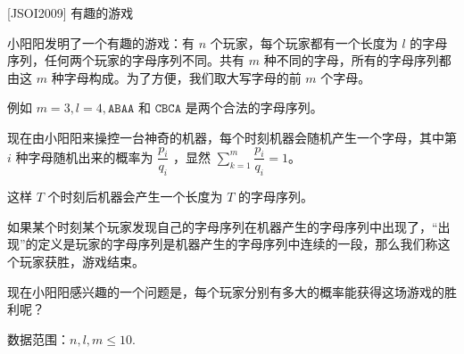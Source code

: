 \documentclass{beamer}
\begin{document}
\begin{frame}{[JSOI2009] 有趣的游戏}
    \footnotesize

    小阳阳发明了一个有趣的游戏：有 $n$ 个玩家，每个玩家都有一个长度为 $l$ 的字母序列，任何两个玩家的字母序列不同。共有 $m$ 种不同的字母，所有的字母序列都由这 $m$ 种字母构成。为了方便，我们取大写字母的前 $m$ 个字母。   
    
    \vspace{1em}
    例如 $m=3,l=4,\texttt{ABAA}$ 和 $\texttt{CBCA}$ 是两个合法的字母序列。       
    
    \vspace{1em}
    现在由小阳阳来操控一台神奇的机器，每个时刻机器会随机产生一个字母，其中第 $i$ 种字母随机出来的概率为 $\dfrac{p_i}{q_i}$ ，显然 $\sum \limits_{k=1}^m \dfrac{p_i}{q_i}=1$。  
    
    \vspace{1em}
    这样 $T$ 个时刻后机器会产生一个长度为 $T$ 的字母序列。  
    
    \vspace{1em}
    如果某个时刻某个玩家发现自己的字母序列在机器产生的字母序列中出现了，“出现”的定义是玩家的字母序列是机器产生的字母序列中连续的一段，那么我们称这个玩家获胜，游戏结束。       
    
    \vspace{1em}
    现在小阳阳感兴趣的一个问题是，每个玩家分别有多大的概率能获得这场游戏的胜利呢？

    \vspace{1em}
    数据范围：$n,l,m\leq 10$.
\end{frame}
\end{document}
